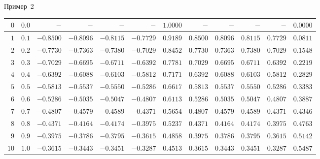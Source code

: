 \documentclass[aspectratio=169, mathserif]{beamer}	%
\begin{document}
\begin{frame}[fragile, ]{Пример~2}
\begin{longtable}{|r|r|r|r|r|r|r|r|r|r|r|r|}
	$0$ & $0.0$ & $-$ & $-$ & $-$ & $-$ & $1.0000$ & $-$ & $-$ & $-$ & $-$ & $0.0000$\\
	\hline
	$1$ & $0.1$ & $-0.8500$ & $-0.8096$ & $-0.8115$ & $-0.7729$ & $0.9189$ & $0.8500$ & $0.8096$ & $0.8115$ & $0.7729$ & $0.0811$\\
	\hline
	$2$ & $0.2$ & $-0.7730$ & $-0.7363$ & $-0.7380$ & $-0.7029$ & $0.8452$ & $0.7730$ & $0.7363$ & $0.7380$ & $0.7029$ & $0.1548$\\
	\hline
	$3$ & $0.3$ & $-0.7029$ & $-0.6695$ & $-0.6711$ & $-0.6392$ & $0.7781$ & $0.7029$ & $0.6695$ & $0.6711$ & $0.6392$ & $0.2219$\\
	\hline
	$4$ & $0.4$ & $-0.6392$ & $-0.6088$ & $-0.6103$ & $-0.5812$ & $0.7171$ & $0.6392$ & $0.6088$ & $0.6103$ & $0.5812$ & $0.2829$\\
	\hline
	$5$ & $0.5$ & $-0.5813$ & $-0.5537$ & $-0.5550$ & $-0.5286$ & $0.6617$ & $0.5813$ & $0.5537$ & $0.5550$ & $0.5286$ & $0.3383$\\
	\hline
	$6$ & $0.6$ & $-0.5286$ & $-0.5035$ & $-0.5047$ & $-0.4807$ & $0.6113$ & $0.5286$ & $0.5035$ & $0.5047$ & $0.4807$ & $0.3887$\\
	\hline
	$7$ & $0.7$ & $-0.4807$ & $-0.4579$ & $-0.4589$ & $-0.4371$ & $0.5654$ & $0.4807$ & $0.4579$ & $0.4589$ & $0.4371$ & $0.4346$\\
	\hline
	$8$ & $0.8$ & $-0.4371$ & $-0.4164$ & $-0.4174$ & $-0.3975$ & $0.5237$ & $0.4371$ & $0.4164$ & $0.4174$ & $0.3975$ & $0.4763$\\
	\hline
	$9$ & $0.9$ & $-0.3975$ & $-0.3786$ & $-0.3795$ & $-0.3615$ & $0.4858$ & $0.3975$ & $0.3786$ & $0.3795$ & $0.3615$ & $0.5142$\\
	\hline
	$10$ & $1.0$ & $-0.3615$ & $-0.3443$ & $-0.3451$ & $-0.3287$ & $0.4513$ & $0.3615$ & $0.3443$ & $0.3451$ & $0.3287$ & $0.5487$\\
	\hline
\end{longtable}
\vfill
\end{frame}
\end{document}
